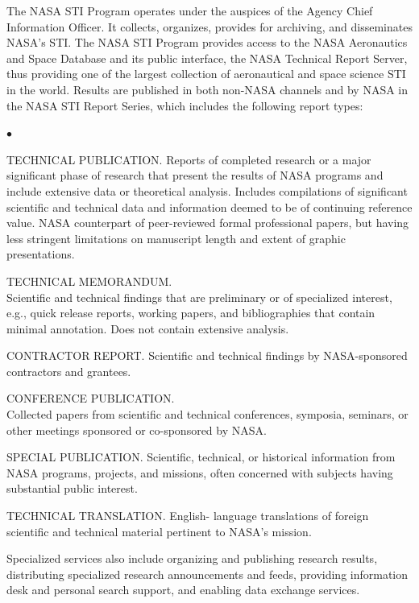 \begin{flushleft}
\begin{twelveptsmall}
The NASA STI Program operates under the auspices of the Agency Chief Information Officer. It collects, organizes, provides for archiving, and disseminates NASA's STI. The NASA STI Program provides access to the NASA Aeronautics and Space Database and its public interface, the NASA Technical Report Server, thus providing one of the largest collection of aeronautical and space science STI in the world. Results are published in both non-NASA channels and by NASA in the NASA STI Report Series, which includes the following report types:
\begin{list}{$\bullet$}%
 {\settowidth{\labelwidth}{$\bullet$}%
  \setlength{\labelsep}{0.5em}%
  \setlength{\leftmargin}{\labelwidth}%
  \addtolength{\leftmargin}{\labelsep}%
  \setlength{\topsep}{0pt}}
\item TECHNICAL PUBLICATION.
  Reports of completed research or a major significant phase of research
  that present the results of NASA programs and include extensive data
  or theoretical analysis.
  Includes compilations of significant scientific and technical data and
  information deemed to be of continuing reference value.
  NASA counterpart of peer-reviewed formal professional papers, but
  having less stringent limitations on manuscript length and extent of
  graphic presentations.
\item TECHNICAL MEMORANDUM.\\
  Scientific and technical findings that are preliminary or of
  specialized interest, e.g., quick release reports, working papers, and
  bibliographies that contain minimal annotation.
  Does not contain extensive analysis.
\item CONTRACTOR REPORT.
  Scientific and technical findings by NASA-sponsored contractors and
  grantees.
\newpage
\item CONFERENCE PUBLICATION.\\
  Collected papers from scientific and technical conferences, symposia,
  seminars, or other meetings sponsored or co-sponsored by NASA.
\item SPECIAL PUBLICATION.
  Scientific, technical, or historical information from NASA programs,
  projects, and missions, often concerned with subjects having
  substantial public interest.
\item TECHNICAL TRANSLATION.
  English- language translations of foreign scientific and technical
  material pertinent to NASA's mission.
\end{list}

 Specialized services also include organizing and publishing research
 results, distributing specialized research announcements and feeds,
 providing information desk and personal search support, and enabling
 data exchange services.


\end{twelveptsmall}
\end{flushleft}
